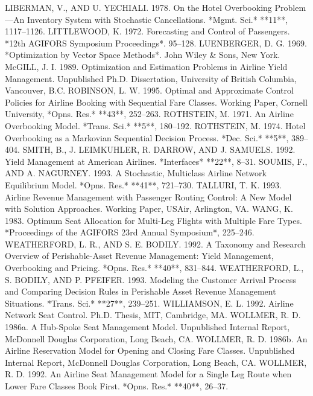 LIBERMAN, V., AND U. YECHIALI. 1978. On the Hotel Overbooking Problem—An Inventory System with Stochastic Cancellations. *Mgmt. Sci.* **11**, 1117–1126.  
LITTLEWOOD, K. 1972. Forecasting and Control of Passengers. *12th AGIFORS Symposium Proceedings*. 95–128.  
LUENBERGER, D. G. 1969. *Optimization by Vector Space Methods*. John Wiley & Sons, New York.  
McGILL, J. I. 1989. Optimization and Estimation Problems in Airline Yield Management. Unpublished Ph.D. Dissertation, University of British Columbia, Vancouver, B.C.  
ROBINSON, L. W. 1995. Optimal and Approximate Control Policies for Airline Booking with Sequential Fare Classes. Working Paper, Cornell University, *Opns. Res.* **43**, 252–263.  
ROTHSTEIN, M. 1971. An Airline Overbooking Model. *Trans. Sci.* **5**, 180–192.  
ROTHSTEIN, M. 1974. Hotel Overbooking as a Markovian Sequential Decision Process. *Dec. Sci.* **5**, 389–404.  
SMITH, B., J. LEIMKUHLER, R. DARROW, AND J. SAMUELS. 1992. Yield Management at American Airlines. *Interfaces* **22**, 8–31.  
SOUMIS, F., AND A. NAGURNEY. 1993. A Stochastic, Multiclass Airline Network Equilibrium Model. *Opns. Res.* **41**, 721–730.  
TALLURI, T. K. 1993. Airline Revenue Management with Passenger Routing Control: A New Model with Solution Approaches. Working Paper, USAir, Arlington, VA.  
WANG, K. 1983. Optimum Seat Allocation for Multi-Leg Flights with Multiple Fare Types. *Proceedings of the AGIFORS 23rd Annual Symposium*, 225–246.  
WEATHERFORD, L. R., AND S. E. BODILY. 1992. A Taxonomy and Research Overview of Perishable-Asset Revenue Management: Yield Management, Overbooking and Pricing. *Opns. Res.* **40**, 831–844.  
WEATHERFORD, L., S. BODILY, AND P. PFEIFER. 1993. Modeling the Customer Arrival Process and Comparing Decision Rules in Perishable Asset Revenue Management Situations. *Trans. Sci.* **27**, 239–251.  
WILLIAMSON, E. L. 1992. Airline Network Seat Control. Ph.D. Thesis, MIT, Cambridge, MA.  
WOLLMER, R. D. 1986a. A Hub-Spoke Seat Management Model. Unpublished Internal Report, McDonnell Douglas Corporation, Long Beach, CA.  
WOLLMER, R. D. 1986b. An Airline Reservation Model for Opening and Closing Fare Classes. Unpublished Internal Report, McDonnell Douglas Corporation, Long Beach, CA.  
WOLLMER, R. D. 1992. An Airline Seat Management Model for a Single Leg Route when Lower Fare Classes Book First. *Opns. Res.* **40**, 26–37.


